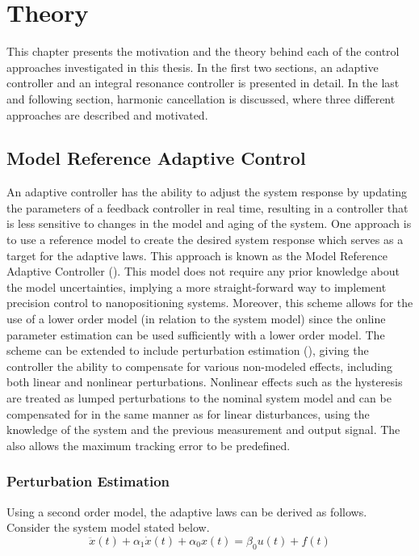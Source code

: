 \chapter{Theory}\label{cha:controlApproach}
This chapter presents the motivation and the theory behind each of the control approaches investigated in this thesis. In the first two sections, an adaptive controller and an integral resonance controller is presented in detail. In the last and following section, harmonic cancellation is discussed, where three different approaches are described and motivated.

\section{Model Reference Adaptive Control}
An adaptive controller has the ability to adjust the system response by updating the parameters of a feedback controller in real time, resulting in a controller that is less sensitive to changes in the model and aging of the system. One approach is to use a reference model to create the desired system response which serves as a target for the adaptive laws. This approach is known as the Model Reference Adaptive Controller (\abbrMRAC). This model does not require any prior knowledge about the model uncertainties, implying a more straight-forward way to implement precision control to nanopositioning systems. Moreover, this scheme allows for the use of a lower order model (in relation to the system model) since the online parameter estimation can be used sufficiently with a lower order model. The \abbrMRAC scheme can be extended to include perturbation estimation (\abbrMRACPE), giving the controller the ability to compensate for various non-modeled effects, including both linear and nonlinear perturbations. Nonlinear effects such as the hysteresis are treated as lumped perturbations to the nominal system model and can be compensated for in the same manner as for linear disturbances, using the knowledge of the system and the previous measurement and output signal. The \abbrMRACPE also allows the maximum tracking error to be predefined.

\subsection{Perturbation Estimation}\label{sec:pertest}
Using a second order model, the adaptive laws can be derived as follows. Consider the system model stated below.
\begin{equation}
  \label{eq:sysmodel}
  \ddot{x}(t) + \alpha_1\dot{x}(t) +  \alpha_0x(t) = \beta_0u(t) + f(t)
\end{equation}

